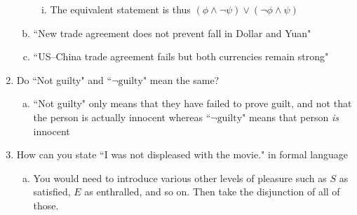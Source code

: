 \documentclass[]{article}
\begin{document}
\begin{enumerate}
\begin{enumerate}[(a)]
\begin{enumerate}[(i)]
  		\item The equivalent statement is thus $(\phi \wedge \neg\psi) \vee (\neg\phi \wedge \psi)$
 	\end{enumerate}
 	\item ``New trade agreement does not prevent fall in Dollar and Yuan" 
 	\item ``US--China trade agreement fails but both currencies remain strong" 
  \end{enumerate}
  \item Do ``Not guilty" and ``$\neg \text{guilty}$" mean the same?
  \begin{enumerate}[(a)]
  	\item ``Not guilty" only means that they have failed to prove guilt, and not that the person is actually innocent whereas ``$\neg \text{guilty}$" means that person \textit{is} innocent
  \end{enumerate}
  \item How can you state ``I was not displeased with the movie." in formal language
  \begin{enumerate}[(a)]
  	\item You would need to introduce various other levels of pleasure such as $S$ as satisfied, $E$ as enthralled, and so on. Then take the disjunction of all of those.
  \end{enumerate}
\end{enumerate}
\end{document}
